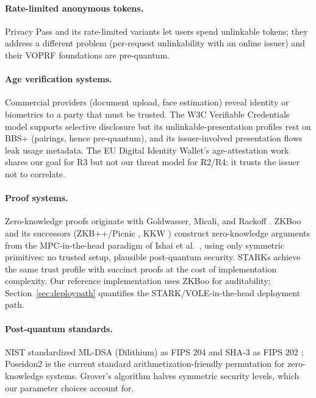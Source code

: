 \documentclass[11pt]{article}
\theoremstyle{definition}
\begin{document}
\paragraph{Rate-limited anonymous tokens.} Privacy Pass \cite{privacypass} and its
rate-limited variants let users spend unlinkable tokens; they address a different problem
(per-request unlinkability with an online issuer) and their VOPRF foundations are
pre-quantum.

\paragraph{Age verification systems.} Commercial providers (document upload, face
estimation) reveal identity or biometrics to a party that must be trusted. The W3C
Verifiable Credentials model \cite{w3cvc} supports selective disclosure but its
unlinkable-presentation profiles rest on BBS+ (pairings, hence pre-quantum), and its
issuer-involved presentation flows leak usage metadata. The EU Digital Identity Wallet's
age-attestation work shares our goal for R3 but not our threat model for R2/R4: it trusts
the issuer not to correlate.

\paragraph{Proof systems.} Zero-knowledge proofs originate with Goldwasser, Micali, and
Rackoff \cite{gmr}. ZKBoo \cite{zkboo} and its successors (ZKB++/Picnic \cite{picnic}, KKW
\cite{kkw}) construct zero-knowledge arguments from the MPC-in-the-head paradigm of Ishai
et al.\ \cite{ikos}, using only symmetric primitives: no trusted setup, plausible
post-quantum security. STARKs \cite{stark} achieve the same trust profile with succinct
proofs at the cost of implementation complexity. Our reference implementation uses ZKBoo
for auditability; Section~\ref{sec:deploypath} quantifies the STARK/VOLE-in-the-head
deployment path.

\paragraph{Post-quantum standards.} NIST standardized ML-DSA (Dilithium) as FIPS 204
\cite{fips204,dilithium} and SHA-3 as FIPS 202 \cite{fips202}; Poseidon2 \cite{poseidon2}
is the current standard arithmetization-friendly permutation for zero-knowledge systems.
Grover's algorithm \cite{grover} halves symmetric security levels, which our parameter
choices account for.
\end{document}
